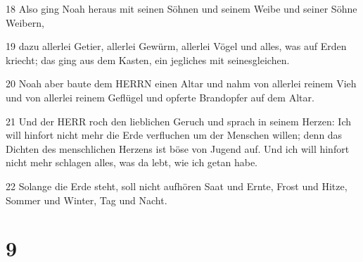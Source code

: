 \par 18 Also ging Noah heraus mit seinen Söhnen und seinem Weibe und seiner Söhne Weibern,
\par 19 dazu allerlei Getier, allerlei Gewürm, allerlei Vögel und alles, was auf Erden kriecht; das ging aus dem Kasten, ein jegliches mit seinesgleichen.
\par 20 Noah aber baute dem HERRN einen Altar und nahm von allerlei reinem Vieh und von allerlei reinem Geflügel und opferte Brandopfer auf dem Altar.
\par 21 Und der HERR roch den lieblichen Geruch und sprach in seinem Herzen: Ich will hinfort nicht mehr die Erde verfluchen um der Menschen willen; denn das Dichten des menschlichen Herzens ist böse von Jugend auf. Und ich will hinfort nicht mehr schlagen alles, was da lebt, wie ich getan habe.
\par 22 Solange die Erde steht, soll nicht aufhören Saat und Ernte, Frost und Hitze, Sommer und Winter, Tag und Nacht.

\chapter{9}


